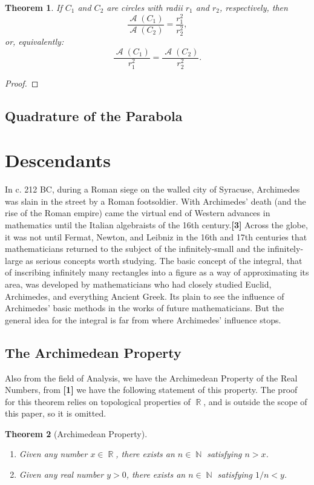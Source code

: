 \documentclass[letterpaper, 12pt]{amsart}
\DeclareMathOperator{\N}{\mathbb{N}}
\DeclareMathOperator{\R}{\mathbb{R}}
\DeclareMathOperator{\A}{\mathcal{A}}
\newtheorem{thm}{Theorem}[section]
\theoremstyle{definition}  %
\begin{document}
		\begin{thm}
		If $C_{1}$ and $C_{2}$ are circles with radii $r_{1}$ and $r_{2}$, respectively, then $$\frac{\A(C_{1})}{\A(C_{2})} = \frac{r_{1}^{2}}{r_{2}^{2}},$$ or, equivalently: $$\frac{\A(C_{1})}{r_{1}^{2}} = \frac{\A(C_{2})}{r_{2}^{2}}.$$
		\end{thm}
		\begin{proof}
		\end{proof}

		\subsection{Quadrature of the Parabola}
		\label{sub:quadrature_of_the_parabola}

	\section{Descendants}
	\label{sec:descendants}
	In c. 212 BC, during a Roman siege on the walled city of Syracuse, Archimedes was slain in the street by a Roman footsoldier.
	With Archimedes' death (and the rise of the Roman empire) came the virtual end of Western advances in mathematics until the Italian algebraists of the 16th century.\textbf{[3]}
	Across the globe, it was not until Fermat, Newton, and Leibniz in the 16th and 17th centuries that mathematicians returned to the subject of the infinitely-small and the infinitely-large as serious concepts worth studying.
	The basic concept of the integral, that of inscribing infinitely many rectangles into a figure as a way of approximating its area, was developed by mathematicians who had closely studied Euclid, Archimedes, and everything Ancient Greek.
	Its plain to see the influence of Archimedes' basic methods in the works of future mathematicians.
	But the general idea for the integral is far from where Archimedes' influence stops.

		\subsection{The Archimedean Property}
		\label{sub:the_archimedean_property}
		Also from the field of Analysis, we have the Archimedean Property of the Real Numbers, from \textbf{[1]} we have the following statement of this property.
		The proof for this theorem relies on topological properties of $\R$, and is outside the scope of this paper, so it is omitted.
		\begin{thm}[Archimedean Property]
		\
			\begin{enumerate}
				\item Given any number $x \in \R$, there exists an $n \in \N$ satisfying $n > x$.
				\item Given any real number $y > 0$, there exists an $n \in \N$ satisfying $1/n < y$.
			\end{enumerate}
		\end{thm}
		
\end{document}

